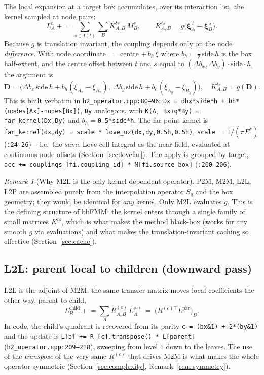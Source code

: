 \documentclass[11pt,a4paper]{article}
\newcommand{\Es}{E^{*}}
\newcommand{\code}[1]{\texttt{#1}}
\theoremstyle{definition}
\theoremstyle{remark}
\newtheorem{remark}{Remark}
\begin{document}
The local expansion at a target box accumulates, over its interaction list, the
kernel sampled at node pairs:
\begin{equation}
  L^t_A \mathrel{+}= \sum_{s\in I(t)}\sum_B K^{ts}_{A,B}\, M^s_B,
  \qquad
  K^{ts}_{A,B} = g\big(\boldsymbol\xi_A^{\,t}-\boldsymbol\xi_B^{\,s}\big).
  \label{eq:m2l}
\end{equation}
Because $g$ is translation invariant, the coupling depends only on the node
\emph{difference}. With node coordinate $=$ centre $+\,b_h\,\xi$ where
$b_h=\tfrac12\,\text{side}\,h$ is the box half-extent, and the centre offset
between $t$ and $s$ equal to $(\Delta b_x,\Delta b_y)\cdot\text{side}\cdot h$, the
argument is
\begin{equation}
  \mathbf D = \big(\Delta b_x\,\text{side}\,h + b_h(\xi_{A_x}-\xi_{B_x}),\
                   \Delta b_y\,\text{side}\,h + b_h(\xi_{A_y}-\xi_{B_y})\big),
  \quad K^{ts}_{A,B}=g(\mathbf D).
  \label{eq:m2l-D}
\end{equation}
This is built verbatim in \code{h2\_operator.cpp:80--96}: \code{Dx = dbx*side*h +
bh*(nodes[Ax]-nodes[Bx])}, \code{Dy} analogous, with
\code{K(A, Bx+q*By) = far\_kernel(Dx,Dy)} and $b_h=$\code{0.5*side*h}. The far
point kernel is \code{far\_kernel(dx,dy) = scale * love\_uz(dx,dy,0.5h,0.5h)},
\code{scale} $=1/(\pi\Es)$ (\code{:24--26}) -- i.e.\ the \emph{same} Love cell
integral as the near field, evaluated at continuous node offsets
(Section~\ref{sec:lovefar}). The apply is grouped by target,
\code{acc += couplings\_[fi.coupling\_id] * M[fi.source\_box]}
(\code{:200--206}).

\begin{remark}[Why M2L is the only kernel-dependent operator]
P2M, M2M, L2L, L2P are assembled purely from the interpolation operator $S_q$ and
the box geometry; they would be identical for \emph{any} kernel. Only M2L
evaluates $g$. This is the defining structure of bbFMM: the kernel enters through
a single family of small matrices $K^{ts}$, which is what makes the method
black-box (works for any smooth $g$ via evaluations) and what makes the
translation-invariant caching so effective (Section~\ref{sec:cache}).
\end{remark}

\subsection{L2L: parent local to children (downward pass)}

L2L is the adjoint of M2M: the same transfer matrix moves local coefficients the
other way, parent to child,
\begin{equation}
  L^{\text{child}}_B \mathrel{+}= \sum_A R^{(c)}_{A,B}\, L^{\text{par}}_A
  \;=\; \big(R^{(c)\top} L^{\text{par}}\big)_B.
  \label{eq:l2l}
\end{equation}
In code, the child's quadrant is recovered from its parity
\code{c = (bx\&1) + 2*(by\&1)} and the update is
\code{L[b] += R\_[c].transpose() * L[parent]} (\code{h2\_operator.cpp:209--218}),
sweeping from level $1$ down to the leaves. The use of the \emph{transpose} of
the very same $R^{(c)}$ that drives M2M is what makes the whole operator
symmetric (Section~\ref{sec:complexity}, Remark~\ref{rem:symmetry}).
\end{document}

